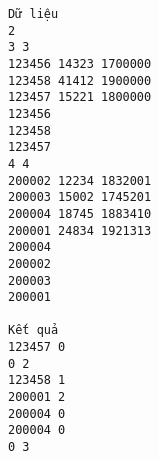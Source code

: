 \begin{verbatim}
Dữ liệu
2
3 3
123456 14323 1700000
123458 41412 1900000
123457 15221 1800000
123456
123458
123457
4 4
200002 12234 1832001
200003 15002 1745201
200004 18745 1883410
200001 24834 1921313
200004
200002
200003
200001

Kết quả
123457 0
0 2
123458 1
200001 2
200004 0
200004 0
0 3
\end{verbatim}